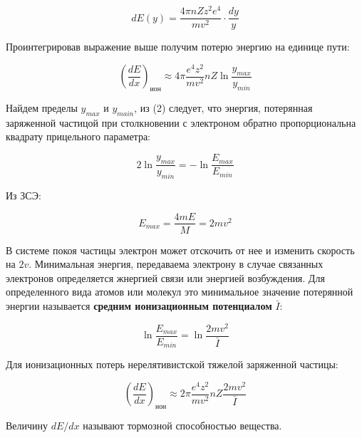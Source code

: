 \documentclass[a4paper]{article}
\begin{document}
\begin{equation}
    dE(y) = \frac{4 \pi n Z z^2 e^4}{mv^2} \cdot \frac{dy}{y}
\end{equation}

Проинтегрировав выражение выше получим потерю энергию на единице пути:

\begin{equation}
    \left ( \frac{dE}{dx} \right )_{ион} \approx 4\pi \frac{e^4 z^2}{mv^2} n Z \ln{\frac{y_{max}}{y_{min}}}
\end{equation}

Найдем пределы $y_{max}$ и $y_{main}$, из (2) следует, что энергия, потерянная заряженной частицой
при столкновении с электроном обратно пропорциональна квадрату прицельного параметра:

\begin{equation}
    2 \ln{\frac{y_{max}}{y_{min}}} = - \ln{\frac{E_{max}}{E_{min}}}
\end{equation}

Из ЗСЭ:

\begin{equation}
    E_{max} = \frac{4mE}{M} = 2 mv^2
\end{equation}

В системе покоя частицы электрон может отскочить от нее и изменить скорость на $2 v$. Минимальная энергия, 
передаваема электрону в случае связанных электронов определяется жнергией связи или энергией возбуждения. Для определенного вида атомов 
или молекул это минимальное значение потерянной энергии называется \textbf{средним ионизационным потенциалом} $\bar{I}$:

\begin{equation}
    \ln{\frac{E_{max}}{E_{min}}} = \ln{\frac{2mv^2}{\bar{I}}}
\end{equation}

Для ионизационных потерь нерелятивистской тяжелой заряженной частицы:

\begin{equation}
    \left ( \frac{dE}{dx} \right )_{ион} \approx 2 \pi \frac{e^4 z^2}{mv^2} n Z \frac{2mv^2}{\bar{I}}
\end{equation}

Величину $dE/dx$ называют тормозной способностью вещества. \par 
\end{document}
